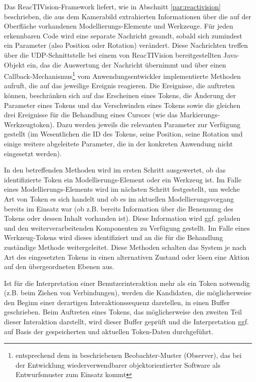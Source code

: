 Das ReacTIVision-Framework liefert, wie in Abschnitt \ref{par:reactivision} beschrieben, die aus dem Kamerabild extrahierten Informationen über die auf der Oberfläche vorhandenen Modellierungs-Elemente und Werkzeuge. Für jeden erkennbaren Code wird eine separate Nachricht gesandt, sobald sich zumindest ein Parameter (also Position oder Rotation) verändert. Diese Nachrichten treffen über die UDP-Schnittstelle bei einem von ReacTIVision bereitgestellten Java-Objekt ein, das die Auswertung der Nachricht übernimmt und über einen Callback-Mechanismus\footnote{entsprechend dem in \citep{Gamma95} beschriebenen Beobachter-Muster (Observer), das bei der Entwicklung wiederverwendbarer objektorientierter Software als Entwurfsmuster zum Einsatz kommt} vom Anwendungsentwickler implementierte Methoden aufruft, die auf das jeweilige Ereignis reagieren. Die Ereignisse, die auftreten können, beschränken sich auf das Erscheinen eines Tokens, die Änderung der Parameter eines Tokens und das Verschwinden eines Tokens sowie die gleichen drei Ereignisse für die Behandlung eines Cursors (wie das Markierungs-Werkzeugtoken). Dazu werden jeweils die relevanten Parameter zur Verfügung gestellt (im Wesentlichen die ID des Tokens, seine Position, seine Rotation und einige weitere abgeleitete Parameter, die in der konkreten Anwendung nicht eingesetzt werden).

In den betreffenden Methoden wird im ersten Schritt ausgewertet, ob das identifizierte Token ein Modellierungs-Element oder ein Werkzeug ist. Im Falle eines Modellierungs-Elements wird im nächsten Schritt festgestellt, um welche Art von Token es sich handelt und ob es im aktuellen Modellierungsvorgang bereits im Einsatz war (ob z.B. bereits Information über die Benennung des Tokens oder dessen Inhalt vorhanden ist). Diese Information wird ggf. geladen und den weiterverarbeitenden Komponenten zu Verfügung gestellt. Im Falle eines Werkzeug-Tokens wird dieses identifiziert und an die für die Behandlung zuständige Methode weitergeleitet. Diese Methoden schalten das System je nach Art des eingesetzten Tokens in einen alternativen Zustand oder lösen eine Aktion auf den übergeordneten Ebenen aus.

Ist für die Interpretation einer Benutzerinteraktion mehr als ein Token notwendig (z.B. beim Ziehen von Verbindungen), werden die Kandidaten, die möglicherweise den Beginn einer derartigen Interaktionssequenz darstellen, in einen Buffer geschrieben. Beim Auftreten eines Tokens, das möglicherweise den zweiten Teil dieser Interaktion darstellt, wird dieser Buffer geprüft und die Interpretation ggf. auf Basis der gespeicherten und aktuellen Token-Daten durchgeführt.

